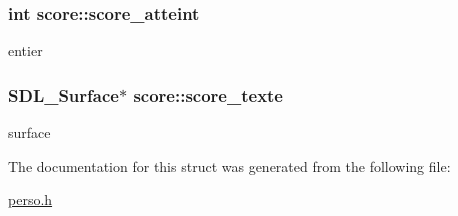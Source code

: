 \subsubsection[{\texorpdfstring{score\+\_\+atteint}{score_atteint}}]{\setlength{\rightskip}{0pt plus 5cm}int score\+::score\+\_\+atteint}\hypertarget{structscore_a86ee1f22a5bf4e92781f2b2165aa0859}{}\label{structscore_a86ee1f22a5bf4e92781f2b2165aa0859}
entier 
\subsubsection[{\texorpdfstring{score\+\_\+texte}{score_texte}}]{\setlength{\rightskip}{0pt plus 5cm}S\+D\+L\+\_\+\+Surface$\ast$ score\+::score\+\_\+texte}\hypertarget{structscore_aa5918332d1797da4bedaccfce5446b88}{}\label{structscore_aa5918332d1797da4bedaccfce5446b88}
surface 

The documentation for this struct was generated from the following file\+:\begin{DoxyCompactItemize}
\item 
\hyperlink{perso_8h}{perso.\+h}\end{DoxyCompactItemize}
